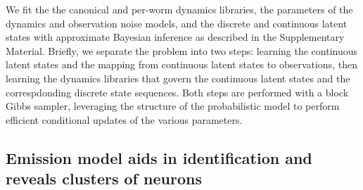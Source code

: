 \documentclass[11pt]{article}
\begin{document}
We fit the the canonical and per-worm dynamics libraries, the
parameters of the dynamics and observation noise models, and the
discrete and continuous latent states with approximate Bayesian
inference as described in the Supplementary Material. Briefly, we
separate the problem into two steps: learning the continuous latent
states and the mapping from continuous latent states to observations,
then learning the dynamics libraries that govern the continuous latent
states and the correspdonding discrete state sequences.  Both steps are
performed with a block Gibbs sampler, leveraging the structure of the
probabilistic model to perform efficient conditional updates of the
various parameters. 

\subsection*{Emission model aids in identification and reveals clusters of neurons}
\end{document}
